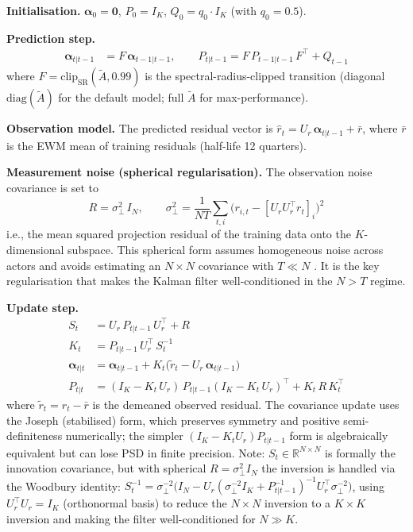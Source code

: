 \documentclass[11pt,a4paper]{article}
\newcommand{\R}{\mathbb{R}}
\newcommand{\diag}{\mathrm{diag}}
\newcommand{\balpha}{\bm{\alpha}}
\newcommand{\clip}{\mathrm{clip}_{\mathrm{SR}}}
\begin{document}
\textbf{Initialisation.} $\balpha_0 = \mathbf{0}$, $P_0 = I_K$, $Q_0 = q_0 \cdot I_K$ (with $q_0 = 0.5$).

\textbf{Prediction step.}
\begin{align}
\balpha_{t|t-1} &= F \, \balpha_{t-1|t-1}, \qquad
P_{t|t-1} = F \, P_{t-1|t-1} \, F^\top + Q_{t-1}
\end{align}
where $F = \clip(\tilde{A}, 0.99)$ is the spectral-radius-clipped transition (diagonal $\diag(\tilde{A})$ for the default model; full $\tilde{A}$ for max-performance).

\textbf{Observation model.} The predicted residual vector is $\hat{r}_t = U_r \, \balpha_{t|t-1} + \bar{r}$, where $\bar{r}$ is the EWM mean of training residuals (half-life 12 quarters).

\textbf{Measurement noise (spherical regularisation).} The observation noise covariance is set to
\begin{equation}
R = \sigma^2_\perp \, I_N, \qquad \sigma^2_\perp = \frac{1}{NT}\sum_{t,i}\bigl(r_{i,t} - [U_r U_r^\top r_t]_i\bigr)^2
\label{eq:sph_r}
\end{equation}
i.e., the mean squared projection residual of the training data onto the $K$-dimensional subspace. This spherical form assumes homogeneous noise across actors and avoids estimating an $N \times N$ covariance with $T \ll N$ \citep[cf.][]{ledoit2004well}. It is the key regularisation that makes the Kalman filter well-conditioned in the $N > T$ regime.

\textbf{Update step.}
\begin{align}
S_t &= U_r \, P_{t|t-1} \, U_r^\top + R \\
K_t &= P_{t|t-1} \, U_r^\top \, S_t^{-1} \\
\balpha_{t|t} &= \balpha_{t|t-1} + K_t \bigl(\tilde{r}_t - U_r \, \balpha_{t|t-1}\bigr) \\
P_{t|t} &= (I_K - K_t \, U_r) \, P_{t|t-1} (I_K - K_t \, U_r)^\top + K_t \, R \, K_t^\top
\end{align}
where $\tilde{r}_t = r_t - \bar{r}$ is the demeaned observed residual. The covariance update uses the Joseph (stabilised) form, which preserves symmetry and positive semi-definiteness numerically; the simpler $(I_K - K_t U_r) P_{t|t-1}$ form is algebraically equivalent but can lose PSD in finite precision. Note: $S_t \in \R^{N \times N}$ is formally the innovation covariance, but with spherical $R = \sigma^2_\perp I_N$ the inversion is handled via the Woodbury identity: $S_t^{-1} = \sigma^{-2}_\perp \bigl(I_N - U_r (\sigma^{-2}_\perp I_K + P_{t|t-1}^{-1})^{-1} U_r^\top \sigma^{-2}_\perp\bigr)$, using $U_r^\top U_r = I_K$ (orthonormal basis) to reduce the $N \times N$ inversion to a $K \times K$ inversion and making the filter well-conditioned for $N \gg K$.
\end{document}
